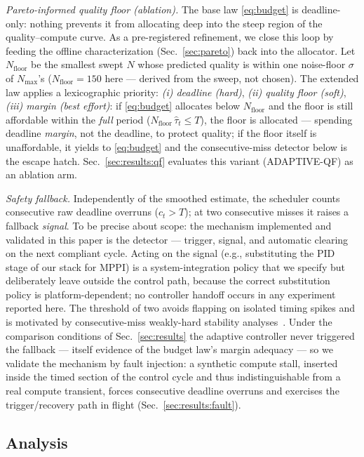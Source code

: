 \documentclass[conference]{IEEEtran}
\begin{document}
\emph{Pareto-informed quality floor (ablation).} The base law
\eqref{eq:budget} is deadline-only: nothing prevents it from allocating
deep into the steep region of the quality--compute curve. As a
pre-registered refinement, we close this loop by feeding the offline
characterization (Sec.~\ref{sec:pareto}) back into the allocator. Let
$N_{\mathrm{floor}}$ be the smallest swept $N$ whose predicted quality
is within one noise-floor $\sigma$ of $N_{\max}$'s
($N_{\mathrm{floor}} = 150$ here --- derived from the sweep, not
chosen). The extended law applies a lexicographic priority:
\emph{(i) deadline (hard)}, \emph{(ii) quality floor (soft)},
\emph{(iii) margin (best effort)}: if \eqref{eq:budget} allocates below
$N_{\mathrm{floor}}$ and the floor is still affordable within the
\emph{full} period ($N_{\mathrm{floor}}\, \hat{\tau}_t \leq T$), the
floor is allocated --- spending deadline \emph{margin}, not the
deadline, to protect quality; if the floor itself is unaffordable, it
yields to \eqref{eq:budget} and the consecutive-miss detector below is
the escape hatch. Sec.~\ref{sec:results:qf} evaluates this variant
(ADAPTIVE-QF) as an ablation arm.

\emph{Safety fallback.} Independently of the smoothed estimate, the
scheduler counts consecutive raw deadline overruns ($c_t > T$); at two
consecutive misses it raises a fallback \emph{signal}. To be precise
about scope: the mechanism implemented and validated in this paper is
the detector --- trigger, signal, and automatic clearing on the next
compliant cycle. Acting on the signal (e.g., substituting the PID stage
of our stack for MPPI) is a system-integration policy that we specify
but deliberately leave outside the control path, because the correct
substitution policy is platform-dependent; no controller handoff occurs
in any experiment reported here. The threshold of two avoids flapping
on isolated timing spikes and is motivated by consecutive-miss
weakly-hard stability analyses~\cite{maggio2020control}. Under the comparison conditions of
Sec.~\ref{sec:results} the adaptive controller never triggered the
fallback --- itself evidence of the budget law's margin adequacy --- so
we validate the mechanism by fault injection: a synthetic compute stall,
inserted inside the timed section of the control cycle and thus
indistinguishable from a real compute transient, forces consecutive
deadline overruns and exercises the trigger/recovery path in flight
(Sec.~\ref{sec:results:fault}).

\subsection{Analysis}
\label{sec:analysis}
\end{document}
